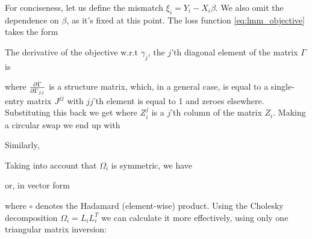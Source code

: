 For conciseness, let us define the mismatch $\xi_i = Y_i - X_i\beta$. We also omit the dependence on $\beta$, as it's fixed at this point. The loss function \ref{eq:lmm_objective} takes the form 

The derivative of the objective w.r.t $\gamma_j$, the $j$'th diagonal element of the matrix $\Gamma$ is


where $\frac{\partial \Gamma}{\partial \Gamma_{jj}}$ is a structure matrix, which, in a general case, is equal to a single-entry matrix $J^{jj}$ with $jj$'th element is equal to 1 and zeroes elsewhere. Substituting this back we get
where $Z^j_i$ is a $j$'th column of the matrix $Z_i$. Making a circular swap we end up with


Similarly,


Taking into account that $\Omega_i$ is symmetric, we have 


or, in vector form


where $\circ$ denotes the Hadamard (element-wise) product. Using the Cholesky decomposition $\Omega_i = L_iL_i^T$ we can calculate it more effectively, using only one triangular matrix inversion:


